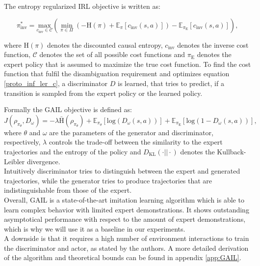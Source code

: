 The entropy regularized IRL objective is written as:

\begin{equation}
    \label{proto_inf_ler_c}
    \pi_{\text{inv}}^* = \underset{c_{\text{inv}} \in \mathcal{C}}{\text{max}} \left( \min_{\pi \in \Pi} \left(- \text{H}(\pi) + \mathbb{E}_{\pi}[c_{\text{inv}}(s, a)] \right) - \mathbb{E}_{\pi_{\text{E}}}[c_{\text{inv}}(s,a)] \right),
\end{equation}
    
where $\text{H}(\pi)$ denotes the discounted causal 
entropy, $c_{\text{inv}}$ denotes the inverse cost function, $\mathcal{C}$ denotes the set of all possible cost functions and $\pi_{\text{E}}$ denotes the expert policy that is assumed to maximize the true cost function.
To find the cost function that fulfil the disambiguation requirement and optimizes equation \ref{proto_inf_ler_c}, a discriminator $D$ is learned, that tries to predict, if a transition is 
sampled from the expert policy or the learned policy.  

Formally the GAIL objective is defined as:
\begin{equation}
    J(\rho_{\pi_{\theta}}, D_{\omega}) =  - \lambda \bar{\text{H}}(\rho_{\pi_{\theta}} ) + \mathbb{E}_{\pi_{\theta}}\left[ \text{log}(D_{\omega}(s,a))\right] + \mathbb{E}_{\pi_{\text{E}}}\left[ \text{log}(1 - D_{\omega}(s,a))\right],
\end{equation}
where $\theta$ and $\omega$ are the parameters of the generator and discriminator, respectively, 
$\lambda$ controls the trade-off between the similarity to the expert trajectories and the entropy of the policy and $D_{\text{KL}}(\cdot || \cdot)$ denotes the Kullback-Leibler divergence. \\
Intuitively discriminator tries to distinguish between the expert and generated trajectories, while the generator tries to produce trajectories that are indistinguishable from those of the expert.\\

Overall, GAIL is a state-of-the-art imitation learning algorithm which is able to learn complex behavior with limited expert demonstrations. It shows outstanding 
asymptotical performance with respect to the amount of expert demonstrations, which is why we will use it as a baseline in our experiments.\\ 
A downside is that it requires a high number of environment interactions to train the discriminator and actor, as stated by the authors. A more detailed derivation of the algorithm and theoretical 
bounds can be found in appendix \ref{app:GAIL}.



